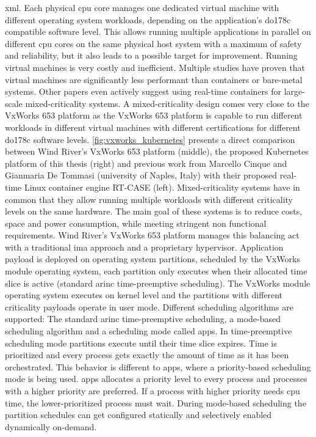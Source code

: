 \documentclass[titlepage]{report}
\begin{document}
\gls{xml}. Each physical \gls{cpu} core manages one dedicated virtual machine with different operating system workloads, depending on the application's \gls{do178c} compatible software level. This allows running multiple applications
in parallel on different \gls{cpu} cores on the same physical host system with a maximum of safety and reliability, but it also leads to a possible target for improvement. Running virtual machines is very costly and inefficient. Multiple studies
have proven that virtual machines are significantly less performant than containers or bare-metal systems\cite{seo2014performance}\cite{felter2015updated}. 
Other papers even actively suggest using real-time containers for large-scale mixed-criticality systems\cite{cinque2017work}. A mixed-criticality design comes very close to the VxWorks 653 platform as the VxWorks 653 platform is capable to run different
workloads in different virtual machines with different certifications for different \gls{do178c} software levels\cite{VXWorks653}. \autoref{fig:vxworks_kubernetes} presents a direct comparison between Wind River's VxWorks 653 platform (middle),
the proposed Kubernetes platform of this thesis (right) and previous work from Marcello Cinque and Gianmaria De Tommasi (university of Naples, Italy) with their proposed real-time Linux container engine RT-CASE (left). Mixed-criticality systems
have in common that they allow running multiple workloads with different criticality levels on the same hardware. The main goal of these systems is to reduce costs, space and power consumption, while meeting stringent
non functional requirements\cite{cinque2017work}. Wind River's VxWorks 653 platform manages this balancing act with a traditional \gls{ima} approach and a proprietary hypervisor. Application payload is deployed on operating system partitions, scheduled
by the VxWorks module operating system, each partition only executes when their allocated time slice is active (standard \gls{arinc} time-preemptive scheduling)\cite{VxWorksProductNote}. 
The VxWorks module operating system executes on kernel level and the partitions with different criticality payloads operate in user mode. Different scheduling algorithms are supported: The standard \gls{arinc} time-preemptive scheduling, a mode-based scheduling
algorithm and a scheduling mode called \gls{apps}\cite{VxWorksProductNote}. In time-preemptive scheduling mode partitions execute until their time slice expires\cite{VxWorksProductNote}. Time is prioritized and every process gets exactly the amount of time
as it has been orchestrated. This behavior is different to \gls{apps}, where a priority-based scheduling mode is being used. \gls{apps} allocates a priority level to every process and processes with a higher priority are preferred. If a process with higher
priority needs \gls{cpu} time, the lower-prioritized process must wait. During mode-based scheduling the partition schedules can get configured statically and selectively enabled dynamically on-demand\cite{VxWorksProductNote}. 
\end{document}
